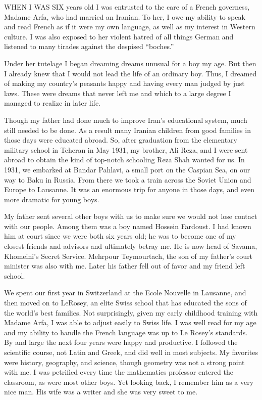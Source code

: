 WHEN I WAS SIX years old I was entrusted to the care of a French governess, Madame Arfa, who had married an Iranian. To her, I owe my ability to speak and read French as if it were my own language, as well as my interest in Western culture. I was also exposed to her violent hatred of all things German and listened to many tirades against the despised “boches.” 

Under her tutelage I began dreaming dreams unusual for a boy my age. But then I already knew that I would not lead the life of an ordinary boy. Thus, I dreamed of making my country’s peasants happy and having every man judged by just laws. These were dreams that never left me and which to a large degree I managed to realize in later life. 

Though my father had done much to improve Iran's educational system, much still needed to be done. As a result many Iranian children from good families in those days were educated abroad. So, after graduation from the elementary military school in Teheran in May 1931, my brother, Ali Reza, and I were sent abroad to obtain the kind of top-notch schooling Reza Shah wanted for us. In 1931, we embarked at Bandar Pahlavi, a small port on the Caspian Sea, on our way to Baku in Russia. From there we took a train across the Soviet Union and Europe to Lausanne. It was an enormous trip for anyone in those days, and even more dramatic for young boys. 

My father sent several other boys with us to make sure we would not lose contact with our people. Among them was a boy named Hossein Fardoust. I had known him at court since we were both six years old; he was to become one of my closest friends and advisors and ultimately betray me. He is now head of Savama, Khomeini’s Secret Service. Mehrpour Teymourtach, the son of my father’s court minister was also with me. Later his father fell out of favor and my friend left school. 

We spent our first year in Switzerland at the Ecole Nouvelle in Lausanne, and then moved on to LeRosey, an elite Swiss school that has educated the sons of the world’s best families. Not surprisingly, given my early childhood training with Madame Arfa, I was able to adjust easily to Swiss life. I was well read for my age and my ability to handle the French language was up to Le Rosey’s standards. By and large the next four years were happy and productive. I followed the scientific course, not Latin and Greek, and did well in most subjects. My favorites were history, geography, and science, though geometry was not a strong point with me. I was petrified every time the mathematics professor entered the classroom, as were most other boys. Yet looking back, I remember him as a very nice man. His wife was a writer and she was very sweet to me. 

